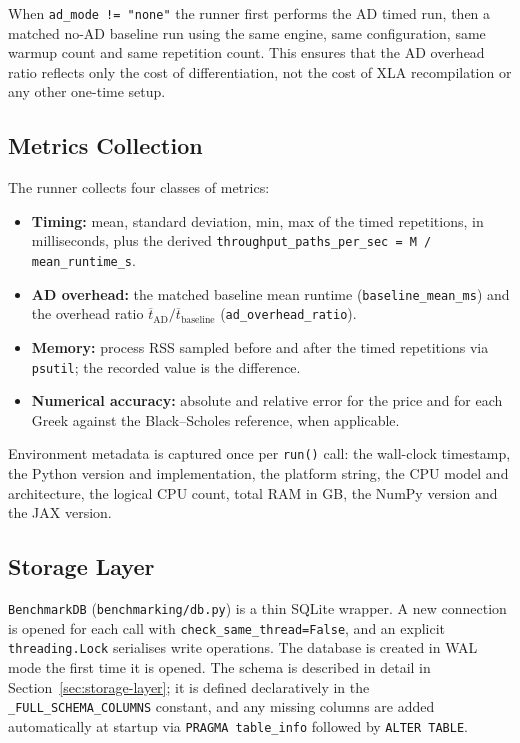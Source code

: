 When \texttt{ad\_mode != "none"} the runner first performs the AD timed run,
then a matched no-AD baseline run using the same engine, same configuration,
same warmup count and same repetition count. This ensures that the AD overhead
ratio reflects only the cost of differentiation, not the cost of XLA
recompilation or any other one-time setup.

\subsection{Metrics Collection}
\label{sec:impl-metrics}

The runner collects four classes of metrics:

\begin{itemize}
    \item \textbf{Timing:} mean, standard deviation, min, max of the timed
          repetitions, in milliseconds, plus the derived
          \texttt{throughput\_paths\_per\_sec = M / mean\_runtime\_s}.
    \item \textbf{AD overhead:} the matched baseline mean runtime
          (\texttt{baseline\_mean\_ms}) and the overhead ratio
          $\overline{t}_{\text{AD}}/\overline{t}_{\text{baseline}}$
          (\texttt{ad\_overhead\_ratio}).
    \item \textbf{Memory:} process RSS sampled before and after the timed
          repetitions via \texttt{psutil}; the recorded value is the difference.
    \item \textbf{Numerical accuracy:} absolute and relative error for the
          price and for each Greek against the Black--Scholes reference, when
          applicable.
\end{itemize}

Environment metadata is captured once per \texttt{run()} call: the wall-clock
timestamp, the Python version and implementation, the platform string, the CPU
model and architecture, the logical CPU count, total RAM in GB, the NumPy
version and the JAX version.

\subsection{Storage Layer}
\label{sec:impl-storage}

\texttt{BenchmarkDB} (\texttt{benchmarking/db.py}) is a thin SQLite wrapper. A
new connection is opened for each call with \texttt{check\_same\_thread=False},
and an explicit \texttt{threading.Lock} serialises write operations. The database
is created in WAL mode the first time it is opened. The schema is described in
detail in Section~\ref{sec:storage-layer}; it is defined declaratively in the
\texttt{\_FULL\_SCHEMA\_COLUMNS} constant, and any missing columns are added
automatically at startup via \texttt{PRAGMA table\_info} followed by
\texttt{ALTER TABLE}.

